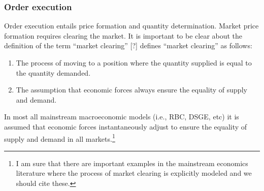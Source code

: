 \documentclass[a4paper]{article}
\begin{document}
\subsubsection{Order execution} Order execution entails price formation and quantity determination. Market price formation requires clearing the market. It is important to be clear about the definition of the term ``market clearing'' [?] defines ``market clearing'' as follows:
\begin{enumerate}
    \item The process of moving to a position where the quantity supplied is equal to the quantity demanded.
    \item The assumption that economic forces always ensure the equality of supply and demand.
\end{enumerate}
In most all mainstream macroeconomic models (i.e., RBC, DSGE, etc) it is assumed that economic forces instantaneously adjust to ensure the equality of supply and demand in all markets.\footnote{
%
I am sure that there are important examples in the mainstream economics literature where the process
of market clearing is explicitly modeled and we should cite these.
%
}
\end{document}
